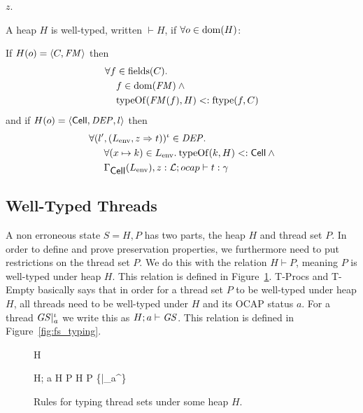 $z$.
\begin{definition}
  A heap $H$ is well-typed, written $\vdash{H}$, if
  $\forall o \in \mbox{$\mathrm{dom}$}{(H)}$:

  If $H(o) = \mbox{$\langle C, \mathit{FM} \rangle$}$ then
  \begin{equation} \label{eq:defwth1}
    \begin{aligned}
      \forall f &\in \mbox{$\mathrm{fields}$}{(C)}. \\ 
      &f \in \mbox{$\mathrm{dom}$}{(\ensuremath{\mathit{FM}})} \: \land \\ 
      &\mbox{$\mathrm{typeOf}$}{(\ensuremath{\mathit{FM}}(f), H)} <: \mbox{$\mathrm{ftype}$}{(f, C)}
    \end{aligned}
  \end{equation}
  and if $H(o) = \mbox{$\langle \mbox{$\mathsf{Cell}$}{}, \mathit{DEP}, l \rangle$}$ then
  \begin{equation} \label{eq:defwth2}
    \begin{aligned}
      \forall (l'&, (L_{\text{env}}, z \Rightarrow t))^\iota \in \mathit{DEP}. \\
      &\forall (x \mapsto k) \in L_{\text{env}}.\: \mbox{$\mathrm{typeOf}$}{(k, H)} <:
      \mbox{$\mathsf{Cell}$} \: \land \\
      &\mbox{$\Gamma_{\mbox{$\mathsf{Cell}$}{}}(L_{\text{env}}), z:
      \mbox{$\mathcal{L}$};\mbox{$ocap$}\vdash t:\gamma$} 
    \end{aligned}
  \end{equation}
\end{definition}

\subsection{Well-Typed Threads}%
\label{sub:well_typed_threads}

A non erroneous state $S = H, P$ has two parts, the heap $H$ and thread set $P$.
In order to define and prove preservation properties, we furthermore need to put
restrictions on the thread set $P$. We do this with the relation $H \vdash P$,
meaning $P$ is well-typed under heap $H$. This relation is defined in
Figure~\ref{fig:ts_typing}.  {\sc T-Procs} and {\sc T-Empty} basically says that
in order for a thread set $P$ to be well-typed under heap $H$, all threads need
to be well-typed under $H$ and its OCAP status $a$.  For a thread $\mathit{GS}|_a^\iota$
we write this as $H; a \vdash \mathit{GS}$. This relation is defined in
Figure~\ref{fig:fs_typing}. 

\begin{figure}
  {H \vdash \emptyset}

  \RuleSpace{}

  { H; a \vdash \FS \andalso H \vdash P }
  { H \vdash P \cup \left\{\FS |_a^\iota \right\} }

  \caption{Rules for typing thread sets under some heap $H$.}
  \label{fig:ts_typing}
\end{figure}

